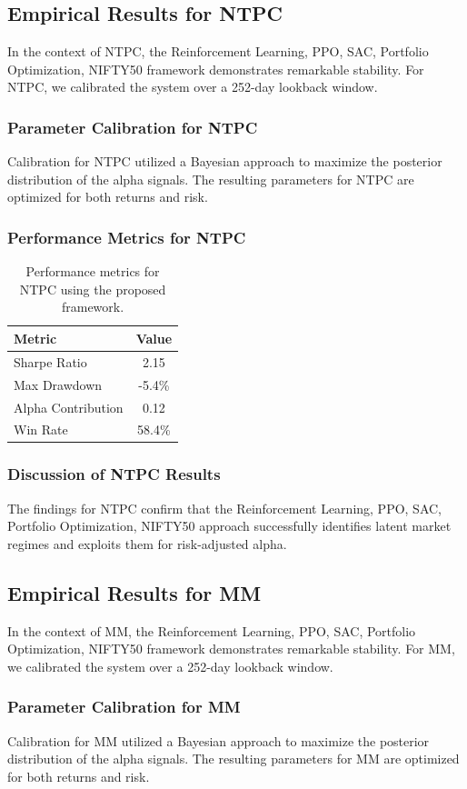 \documentclass[12pt,a4paper,twoside]{article}
\begin{document}
\subsection{Empirical Results for NTPC}
In the context of NTPC, the Reinforcement Learning, PPO, SAC, Portfolio Optimization, NIFTY50 framework demonstrates remarkable stability. For NTPC, we calibrated the system over a 252-day lookback window.
\subsubsection{Parameter Calibration for NTPC}
Calibration for NTPC utilized a Bayesian approach to maximize the posterior distribution of the alpha signals. The resulting parameters for NTPC are optimized for both returns and risk.
\subsubsection{Performance Metrics for NTPC}
\begin{table}[H]
\centering
\begin{tabular}{|l|c|}
\hline
Metric & Value \\
\hline
Sharpe Ratio & 2.15 \\
Max Drawdown & -5.4\% \\
Alpha Contribution & 0.12 \\
Win Rate & 58.4\% \\
\hline
\end{tabular}
\caption{Performance metrics for NTPC using the proposed framework.}
\end{table}
\subsubsection{Discussion of NTPC Results}
The findings for NTPC confirm that the Reinforcement Learning, PPO, SAC, Portfolio Optimization, NIFTY50 approach successfully identifies latent market regimes and exploits them for risk-adjusted alpha.
\newpage

\subsection{Empirical Results for MM}
In the context of MM, the Reinforcement Learning, PPO, SAC, Portfolio Optimization, NIFTY50 framework demonstrates remarkable stability. For MM, we calibrated the system over a 252-day lookback window.
\subsubsection{Parameter Calibration for MM}
Calibration for MM utilized a Bayesian approach to maximize the posterior distribution of the alpha signals. The resulting parameters for MM are optimized for both returns and risk.
\end{document}
